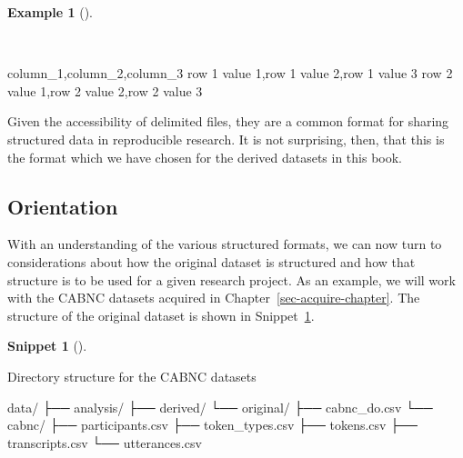 \documentclass[
  letterpaper,
  krantz1]{latex/krantz-mod}
\newenvironment{Shaded}{\begin{snugshade}}{\end{snugshade}}
\newcommand{\ExtensionTok}[1]{\textcolor[rgb]{0.00,0.00,0.00}{#1}}
\newcommand{\NormalTok}[1]{\textcolor[rgb]{0.00,0.00,0.00}{#1}}
\theoremstyle{definition}
\newtheorem{definition}{Snippet}[chapter]
\theoremstyle{definition}
\newtheorem{example}{Example}[chapter]
\theoremstyle{remark}
\begin{document}
\begin{example}[]\protect\hypertarget{exm-curate-csv-example}{}\label{exm-curate-csv-example}

~

\begin{Shaded}
\begin{Highlighting}[numbers=left,,]
\NormalTok{column\_1,column\_2,column\_3}
\NormalTok{row 1 value 1,row 1 value 2,row 1 value 3}
\NormalTok{row 2 value 1,row 2 value 2,row 2 value 3}
\end{Highlighting}
\end{Shaded}

\end{example}

Given the accessibility of delimited files, they are a common format for
sharing structured data in reproducible research. It is not surprising,
then, that this is the format which we have chosen for the derived
datasets in this book.

\subsection{Orientation}\label{orientation-1}

With an understanding of the various structured formats, we can now turn
to considerations about how the original dataset is structured and how
that structure is to be used for a given research project. As an
example, we will work with the CABNC datasets acquired in
Chapter~\ref{sec-acquire-chapter}. The structure of the original dataset
is shown in Snippet~\ref{def-curate-cabnc-structure}.

\pagebreak

\begin{definition}[]\protect\hypertarget{def-curate-cabnc-structure}{}\label{def-curate-cabnc-structure}

Directory structure for the CABNC datasets

\begin{Shaded}
\begin{Highlighting}[]
\ExtensionTok{data/}
\ExtensionTok{├──}\NormalTok{ analysis/}
\ExtensionTok{├──}\NormalTok{ derived/}
\ExtensionTok{└──}\NormalTok{ original/}
    \ExtensionTok{├──}\NormalTok{ cabnc\_do.csv}
    \ExtensionTok{└──}\NormalTok{ cabnc/}
        \ExtensionTok{├──}\NormalTok{ participants.csv}
        \ExtensionTok{├──}\NormalTok{ token\_types.csv}
        \ExtensionTok{├──}\NormalTok{ tokens.csv}
        \ExtensionTok{├──}\NormalTok{ transcripts.csv}
        \ExtensionTok{└──}\NormalTok{ utterances.csv}
\end{Highlighting}
\end{Shaded}

\end{definition}
\end{document}
